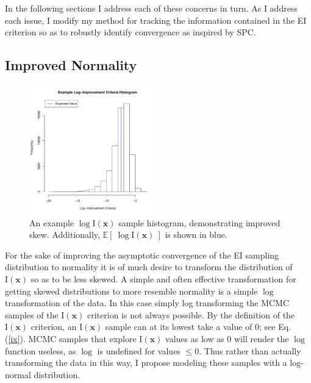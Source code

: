 \documentclass[12pt]{article}
\newcommand{\E}[1]{
        \mathbb{E}\left[~#1~\right]
}
\def \ix {
	\text{I}(\bm{x})
}
\begin{document}
	
	In the following sections I address each of these concerns in turn. 
	As I address each issue, I modify my method for tracking the information contained in the EI criterion so as to robustly identify convergence as inspired by SPC.

	\clearpage
	\subsection{Improved Normality}
	
	\begin{figure}
	\vspace{-1.1cm}
	\begin{center}
	\includegraphics[width=0.5\textwidth]{./figures/exampleLogIHist.pdf}
	\end{center}
	\vspace{-0.85cm}
	\caption{An example $\log\ix$ sample histogram, demonstrating improved skew. Additionally, $\E{\log\ix}$ is shown in blue.}
	\label{logIxEX}
	\end{figure}
	
	For the sake of improving the asymptotic convergence of the EI sampling distribution to normality it is of much desire to transform the distribution of $\ix$ so as to be less skewed.
	A simple and often effective transformation for getting skewed distributions to more resemble normality is a simple $\log$ transformation of the data.
	In this case simply log transforming the MCMC samples of the $\ix$ criterion is not always possible.
	By the definition of the $\ix$ criterion, an $\ix$ sample can at its lowest take a value of 0; see Eq. (\ref{ix}).
	MCMC samples that explore $\ix$ values as low as 0 will render the $\log$ function useless, as $\log$ is undefined for values $\le 0$.
	Thus rather than actually transforming the data in this way, I propose modeling these samples with a log-normal distribution.
	
\end{document}
